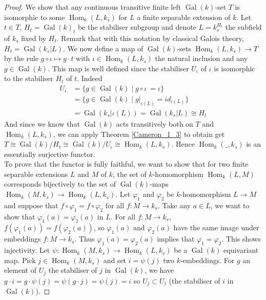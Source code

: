 \documentclass{article}
\theoremstyle{plain}
\theoremstyle{definition}
\DeclareMathOperator{\Hom}{Hom}
\DeclareMathOperator{\Gal}{Gal}
\begin{document}
\begin{proof}
    We show that any continuous transitive finite left $\Gal(k)$-set $T$ is isomorphic to some $\Hom_k(L,k_s)$ for $L$ a finite separable extension of $k$.
    Let $t\in T$, $H_t = \Gal(k)_t$ be the stabiliser subgroup and denote $L=k_s^{H_t}$ the subfield of $k_s$ fixed by $H_t$.
    Remark that with this notation by classical Galois theory, $H_t = \Gal(k_s|L)$.
    We now define a map of $\Gal(k)$-sets $\Hom_k(L,k_s) \rightarrow T$ by the rule $g\circ \iota \mapsto g\cdot t$ with $\iota\in \Hom_k(L,k_s)$ the natural inclusion and any $g\in \Gal(k)$. 
    This map is well defined since the stabiliser $U_{\iota}$ of $\iota$ is isomorphic to the stabiliser $H_t$ of $t$.
    Indeed 
    \begin{equation*}
    \begin{split}
        U_{\iota} &= \{g\in \Gal(k) \mid g\circ \iota\ = \iota\}\\
                               &= \{g\in \Gal(k)\mid g\vert_{\iota(L)}=id_{\iota(L)}\}\\
                               &= \Gal(k_s|\iota(L)) = \Gal(k_s|L) \cong H_t
    \end{split}         
    \end{equation*}
    And since we know that $\Gal(k)$ acts transitively both on $T$ and $\Hom_k(L,k_s)$, we can apply Theorem \ref{Cameron_1_3} to obtain get $T\cong \Gal(k)/H_t \cong \Gal(k)/U_{\iota} \cong \Hom_k(L,k_s)$.
    Hence $\Hom_k(\_,k_s)$ is an essentially surjective functor.\\
    To prove that the functor is fully faithful, we want to show that for two finite separable extensions $L$ and $M$ of $k$, the set of $k$-homomorphism $\Hom_k(L,M)$ corresponds bijectively to the set of $\Gal(k)$-maps $\Hom_k(M,k_s)\rightarrow \Hom_k(L,k_s)$.
    Let $\varphi_1$ and $\varphi_2$ be $k$-homomorphism $L\rightarrow M$ and suppose that $f\circ \varphi_1 = f\circ \varphi_2$ for all $f:M\rightarrow k_s$.
    Take any $a\in L$, we want to show that $\varphi_1(a) = \varphi_2(a)$ in $L$.
    For all $f:M\rightarrow k_s$, $f(\varphi_1(a)) = f(\varphi_2(a))$, so $\varphi_1(a)$ and $\varphi_2(a)$ have the same image under embeddings $f :M\rightarrow k_s$.
    Thus $\varphi_1(a) = \varphi_2(a)$ implies that $\varphi_1=\varphi_2$. This shows injectivity.
    Let $\psi:\Hom_k(M,k_s) \rightarrow \Hom_k(L,k_s)$ be a $\Gal(k)$ equivariant map.
    Pick $j\in \Hom_k(M,k_s)$ and set $i=\psi(j)$ two $k$-embeddings.
    For $g$ an element of $U_j$ the stabiliser of $j$ in $\Gal(k)$, we have $g\cdot i = g\cdot \psi(j) = \psi(g\cdot j) = \psi(j) = i$ so $U_j \subset U_i$ (the stabiliser of $i$ in $\Gal(k)$).

\end{proof}
\end{document}
